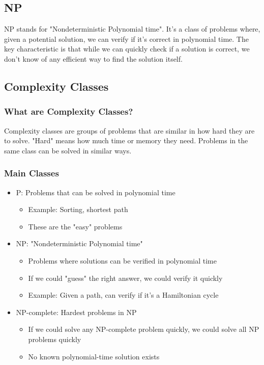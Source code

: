 \documentclass[11pt,a4paper]{article}
\begin{document}
\begin{multicols}{2}
\subsection{NP}
NP stands for "Nondeterministic Polynomial time".
It's a class of problems where, given a potential solution, we can verify if it's correct in polynomial time.
The key characteristic is that while we can quickly check if a solution is correct, we don't know of any efficient way to find the solution itself.
\subsection{Complexity Classes}
\subsubsection{What are Complexity Classes?}
Complexity classes are groups of problems that are similar in how hard they are to solve. "Hard" means how much time or memory they need. Problems in the same class can be solved in similar ways.

\subsubsection{Main Classes}
\begin{itemize}
    \item P: Problems that can be solved in polynomial time
    \begin{itemize}
        \item Example: Sorting, shortest path
        \item These are the "easy" problems
    \end{itemize}
    \item NP: "Nondeterministic Polynomial time"
    \begin{itemize}
        \item Problems where solutions can be verified in polynomial time
        \item If we could "guess" the right answer, we could verify it quickly
        \item Example: Given a path, can verify if it's a Hamiltonian cycle
    \end{itemize}
    \item NP-complete: Hardest problems in NP
    \begin{itemize}
        \item If we could solve any NP-complete problem quickly, we could solve all NP problems quickly
        \item No known polynomial-time solution exists
    \end{itemize}
\end{itemize}


\end{multicols}
\end{document}
